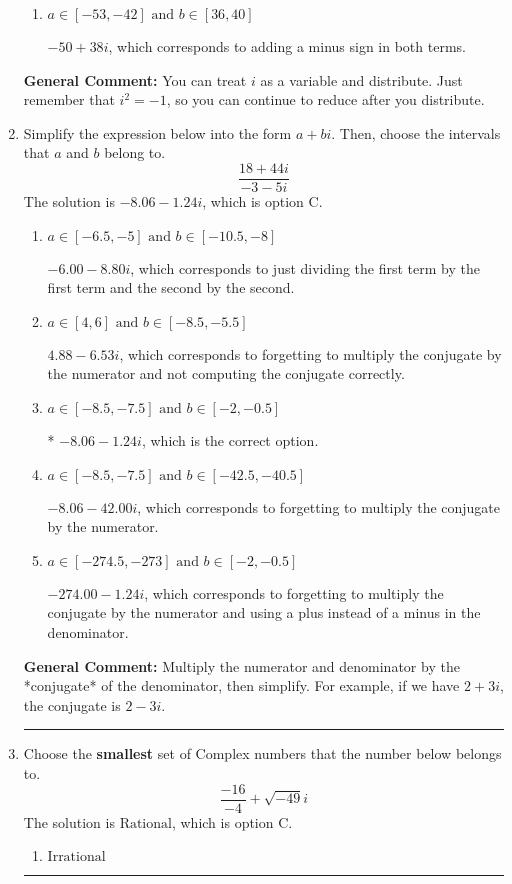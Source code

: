 \documentclass{extbook}[14pt]
\newcommand{\litem}[1]{\item #1

\rule{\textwidth}{0.4pt}}
\begin{document}
\begin{enumerate}
{\begin{enumerate}[label=\Alph*.]
 $6 + 56 i$, which corresponds to just multiplying the real terms to get the real part of the solution and the coefficients in the complex terms to get the complex part.
\item \( a \in [-53, -42] \text{ and } b \in [36, 40] \)

 $-50 + 38 i$, which corresponds to adding a minus sign in both terms.
\end{enumerate}

\textbf{General Comment:} You can treat $i$ as a variable and distribute. Just remember that $i^2=-1$, so you can continue to reduce after you distribute.
}
\litem{
Simplify the expression below into the form $a+bi$. Then, choose the intervals that $a$ and $b$ belong to.
\[ \frac{18 + 44 i}{-3 - 5 i} \]The solution is \( -8.06  - 1.24 i \), which is option C.\begin{enumerate}[label=\Alph*.]
\item \( a \in [-6.5, -5] \text{ and } b \in [-10.5, -8] \)

 $-6.00  - 8.80 i$, which corresponds to just dividing the first term by the first term and the second by the second.
\item \( a \in [4, 6] \text{ and } b \in [-8.5, -5.5] \)

 $4.88  - 6.53 i$, which corresponds to forgetting to multiply the conjugate by the numerator and not computing the conjugate correctly.
\item \( a \in [-8.5, -7.5] \text{ and } b \in [-2, -0.5] \)

* $-8.06  - 1.24 i$, which is the correct option.
\item \( a \in [-8.5, -7.5] \text{ and } b \in [-42.5, -40.5] \)

 $-8.06  - 42.00 i$, which corresponds to forgetting to multiply the conjugate by the numerator.
\item \( a \in [-274.5, -273] \text{ and } b \in [-2, -0.5] \)

 $-274.00  - 1.24 i$, which corresponds to forgetting to multiply the conjugate by the numerator and using a plus instead of a minus in the denominator.
\end{enumerate}

\textbf{General Comment:} Multiply the numerator and denominator by the *conjugate* of the denominator, then simplify. For example, if we have $2+3i$, the conjugate is $2-3i$.
}
\litem{
Choose the \textbf{smallest} set of Complex numbers that the number below belongs to.
\[ \frac{-16}{-4}+\sqrt{-49}i \]The solution is \( \text{Rational} \), which is option C.\begin{enumerate}[label=\Alph*.]
\item \( \text{Irrational} \)


\end{enumerate}}
\end{enumerate}
\end{document}
